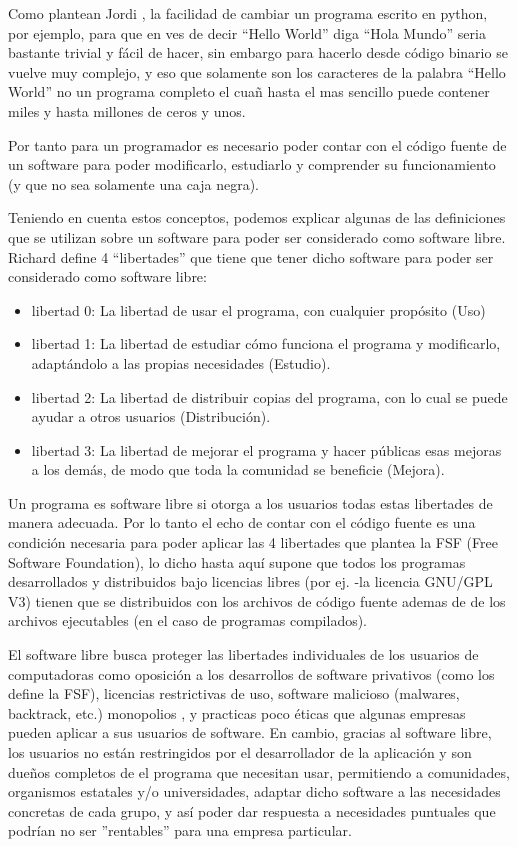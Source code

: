   
  
Como plantean Jordi \cite{adell_software_2007}, la facilidad de cambiar un programa escrito en python, por ejemplo, para que en ves de decir “Hello World” diga “Hola Mundo” seria bastante trivial y fácil de hacer, sin embargo para hacerlo desde código binario se vuelve muy complejo, y eso que solamente son los caracteres de la palabra “Hello World” no un programa completo el cuañ hasta el mas sencillo puede contener miles y hasta  millones de ceros y unos.

 Por tanto para un programador es necesario poder contar con el código fuente de un software para poder modificarlo, estudiarlo y comprender su funcionamiento (y que no sea solamente una caja negra).
 
Teniendo en cuenta estos conceptos, podemos explicar algunas de las definiciones que se utilizan sobre un software para poder ser considerado como software libre. Richard \cite{stallman_software_2007} define 4 “libertades” que tiene que tener dicho software para poder ser considerado como software libre:

\begin{itemize}
   \item libertad 0: La libertad de usar el programa, con cualquier propósito (Uso)
   \item libertad 1: La libertad de estudiar cómo funciona el programa y modificarlo, adaptándolo a las propias necesidades (Estudio).
   \item libertad 2: La libertad de distribuir copias del programa, con lo cual se puede ayudar a otros usuarios (Distribución).
   \item libertad 3: La libertad de mejorar el programa y hacer públicas esas mejoras a los demás, de modo que toda la comunidad se beneficie (Mejora).
 \end{itemize} 
 
Un programa es software libre si otorga a los usuarios todas estas libertades de manera adecuada. Por lo tanto el echo de contar con el código fuente es una condición necesaria para poder aplicar las 4 libertades que plantea la FSF (Free Software Foundation), lo dicho hasta aquí supone que todos los programas desarrollados y distribuidos bajo licencias libres (por ej. -la licencia GNU/GPL V3) tienen que se distribuidos con los archivos de código fuente ademas de de los archivos ejecutables (en el caso de programas compilados).

El software libre busca proteger las libertades individuales de los usuarios de computadoras como oposición a los desarrollos de software privativos (como los define la FSF), licencias restrictivas de uso, software malicioso (malwares, backtrack, etc.) monopolios \citep{beatriz_busaniche_argentina_2010}, y practicas poco éticas que algunas empresas pueden aplicar a sus usuarios de software. En cambio, gracias al software libre, los usuarios no están restringidos por el desarrollador de la aplicación y son dueños completos de el programa que necesitan usar, permitiendo a comunidades, organismos estatales y/o universidades, adaptar dicho software a las necesidades concretas de cada grupo, y así poder dar respuesta a necesidades puntuales que podrían no ser ''rentables'' para una empresa particular.

